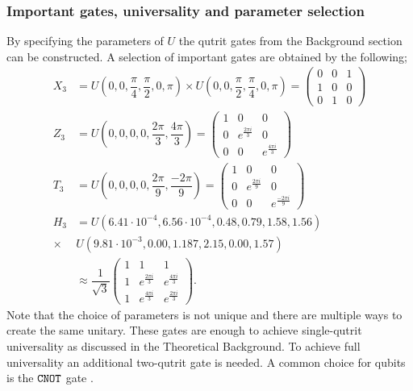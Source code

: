 \subsubsection{Important gates, universality and parameter selection}
By specifying the parameters of $U$ the qutrit gates from the Background section can be constructed. A selection of important gates are obtained by the following;
\begin{equation}
\begin{aligned}
X_3 &= U(0,0,\dfrac{\pi}{4},\dfrac{\pi}{2},0,\pi)\times U(0,0,\dfrac{\pi}{2},\dfrac{\pi}{4},0,\pi) 
= \begin{pmatrix}
0&0&1
\\
1&0&0
\\
0&1&0
\end{pmatrix}
\\ 
Z_3 &= U(0,0,0,0,\dfrac{2\pi}{3},\dfrac{4\pi}{3})
= \begin{pmatrix}
1&0&0
\\
0&e^{\frac{2\pi i}{3}}&0
\\
0&0&e^{\frac{4\pi i}{3}}
\end{pmatrix}
\\
T_3 &= U(0,0,0,0,\dfrac{2\pi}{9},\dfrac{-2\pi}{9})
= \begin{pmatrix}
1&0&0
\\
0&e^{\frac{2\pi i}{9}}&0
\\
0&0&e^{\frac{-2\pi i}{9}}
\end{pmatrix}
\\
H_3 &= U(6.41\cdot 10^{-4}, 6.56\cdot 10^{-4}, 0.48, 0.79, 1.58, 1.56)\\ \times &U(9.81\cdot 10^{-3}, 0.00, 1.187, 2.15, 0.00, 1.57)\\
&\approx \dfrac{1}{\sqrt{3}}\begin{pmatrix}
1&1&1
\\
1&e^{\frac{2\pi i}{3}}&e^{\frac{4\pi i}{3}}
\\
1&e^{\frac{4\pi i}{3}}&e^{\frac{2\pi i}{3}}
\end{pmatrix}.
\end{aligned}
\end{equation}
Note that the choice of parameters is not unique and there are multiple ways to create the same unitary. These gates are enough to achieve single-qutrit universality as discussed in the Theoretical Background. To achieve full universality an additional two-qutrit gate is needed. A common choice for qubits is the ${\tt CNOT}$ gate \cite{qudit}.

